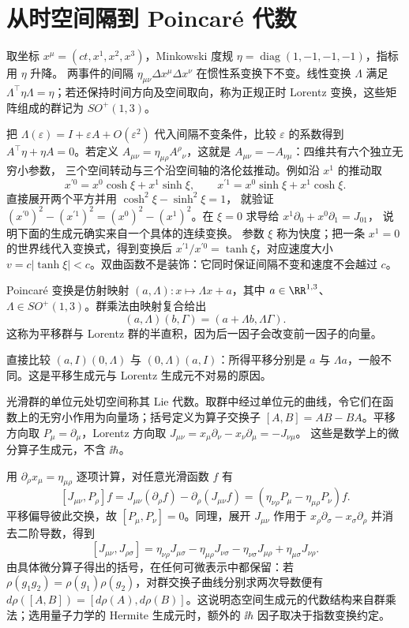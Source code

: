 \section{从时空间隔到 Poincaré 代数}

取坐标 \(x^\mu=(ct,x^1,x^2,x^3)\)，Minkowski 度规
\(\eta=\operatorname{diag}(1,-1,-1,-1)\)，指标用 \(\eta\) 升降。
两事件的间隔 \(\eta_{\mu\nu}\Delta x^\mu\Delta x^\nu\) 在惯性系变换下不变。线性变换 \(\Lambda\) 满足
\(\Lambda^\top\eta\Lambda=\eta\)；若还保持时间方向及空间取向，称为正规正时 Lorentz 变换，这些矩阵组成的群记为 \(SO^+(1,3)\)。

把 \(\Lambda(\varepsilon)=I+\varepsilon A+O(\varepsilon^2)\)
代入间隔不变条件，比较 \(\varepsilon\) 的系数得到
\(A^\top\eta+\eta A=0\)。若定义
\(A_{\mu\nu}=\eta_{\mu\rho}A^\rho{}_\nu\)，这就是
\(A_{\mu\nu}=-A_{\nu\mu}\)：四维共有六个独立无穷小参数，
三个空间转动与三个沿空间轴的洛伦兹推动。例如沿 \(x^1\) 的推动取
\[
x^{\prime0}=x^0\cosh\xi+x^1\sinh\xi,\qquad
x^{\prime1}=x^0\sinh\xi+x^1\cosh\xi.
\]
直接展开两个平方并用 \(\cosh^2\xi-\sinh^2\xi=1\)，
就验证 \((x^{\prime0})^2-(x^{\prime1})^2
=(x^0)^2-(x^1)^2\)。在 \(\xi=0\) 求导给
\(x^1\partial_0+x^0\partial_1=J_{01}\)，
说明下面的生成元确实来自一个具体的连续变换。
参数 \(\xi\) 称为快度；把一条 \(x^1=0\) 的世界线代入变换式，得到变换后 \(x^{\prime1}/x^{\prime0}=\tanh\xi\)，对应速度大小 \(v=c|\tanh\xi|<c\)。双曲函数不是装饰：它同时保证间隔不变和速度不会越过 \(c\)。

\begin{definition}[Poincaré 群]
Poincaré 变换是仿射映射 \((a,\Lambda):x\mapsto\Lambda x+a\)，其中 \(a\in\RR^{1,3}\)、\(\Lambda\in SO^+(1,3)\)。群乘法由映射复合给出
\[
(a,\Lambda)(b,\Gamma)=(a+\Lambda b,\Lambda\Gamma).
\]
这称为平移群与 Lorentz 群的半直积，因为后一因子会改变前一因子的向量。
\end{definition}

直接比较 \((a,I)(0,\Lambda)\) 与 \((0,\Lambda)(a,I)\)：所得平移分别是 \(a\) 与 \(\Lambda a\)，一般不同。这是平移生成元与 Lorentz 生成元不对易的原因。

\begin{definition}
光滑群的单位元处切空间称其 Lie 代数。取群中经过单位元的曲线，令它们在函数上的无穷小作用为向量场；括号定义为算子交换子 \([A,B]=AB-BA\)。平移方向取
\(P_\mu=\partial_\mu\)，Lorentz 方向取
\(J_{\mu\nu}=x_\mu\partial_\nu-x_\nu\partial_\mu=-J_{\nu\mu}\)。
这些是数学上的微分算子生成元，不含 \(\ii\hbar\)。
\end{definition}

用 \(\partial_\rho x_\mu=\eta_{\mu\rho}\) 逐项计算，对任意光滑函数 \(f\) 有
\[
[J_{\mu\nu},P_\rho]f
=J_{\mu\nu}(\partial_\rho f)
-\partial_\rho(J_{\mu\nu}f)
=(\eta_{\nu\rho}P_\mu-\eta_{\mu\rho}P_\nu)f.
\]
平移偏导彼此交换，故 \([P_\mu,P_\nu]=0\)。同理，展开 \(J_{\mu\nu}\) 作用于
\(x_\rho\partial_\sigma-x_\sigma\partial_\rho\) 并消去二阶导数，得到
\[
[J_{\mu\nu},J_{\rho\sigma}]
=\eta_{\nu\rho}J_{\mu\sigma}-\eta_{\mu\rho}J_{\nu\sigma}
-\eta_{\nu\sigma}J_{\mu\rho}+\eta_{\mu\sigma}J_{\nu\rho}.
\]
由具体微分算子得出的括号，在任何可微表示中都保留：若
\(\rho(g_1g_2)=\rho(g_1)\rho(g_2)\)，对群交换子曲线分别求两次导数便有
\(d\rho([A,B])=[d\rho(A),d\rho(B)]\)。这说明态空间生成元的代数结构来自群乘法；选用量子力学的 Hermite 生成元时，额外的 \(\ii\hbar\) 因子取决于指数变换约定。

